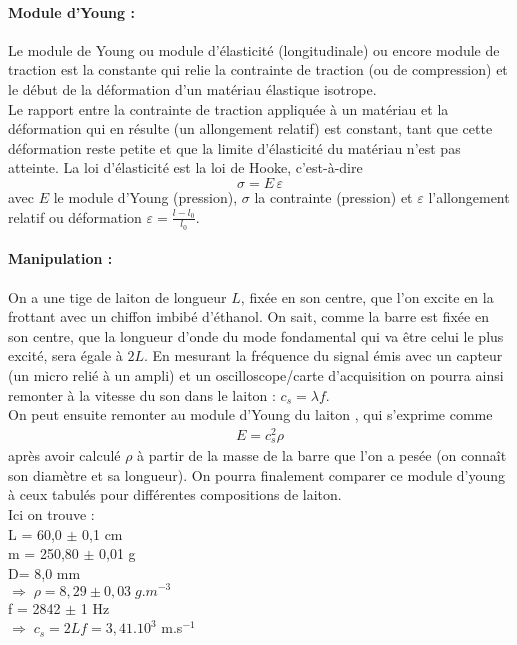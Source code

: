 \documentclass[12pt,prb,aps,epsf]{article}
\begin{document}
\paragraph{Module d'Young :}
Le module de Young ou module d’élasticité (longitudinale) ou encore module de traction est la constante qui relie la contrainte de traction (ou de compression) et le début de la déformation d'un matériau élastique isotrope.\\
Le rapport entre la contrainte de traction appliquée à un matériau et la déformation qui en résulte (un allongement relatif) est constant, tant que cette déformation reste petite et que la limite d'élasticité du matériau n'est pas atteinte. La loi d'élasticité est la loi de Hooke, c'est-à-dire
\begin{equation}
\sigma = E\, \varepsilon
\end{equation}
avec $E$ le module d'Young (pression), $\sigma$ la contrainte (pression) et $\varepsilon$ l'allongement relatif ou déformation $\varepsilon = \frac{l-l_0}{l_0}$.\\

\paragraph{Manipulation :}

On a une tige de laiton de longueur $L$, fixée en son centre, que l'on excite en la frottant avec un chiffon imbibé d'éthanol. On sait, comme la barre est fixée en son centre, que la longueur d'onde du mode fondamental qui va être celui le plus excité, sera égale à $2L$. En mesurant la fréquence du signal émis avec un capteur (un micro relié à un ampli) et un oscilloscope/carte d'acquisition on pourra ainsi remonter à la vitesse du son dans le laiton : $c_s=\lambda f$.\\ On peut ensuite remonter au module d'Young du laiton , qui s'exprime comme 
\begin{eqnarray}
E = c_s^2\rho
\end{eqnarray}
après avoir calculé $\rho$ à partir de la masse de la barre que l'on a pesée (on connaît son diamètre et sa longueur). On pourra finalement comparer ce module d'young à ceux tabulés pour différentes compositions de laiton.\\ 

Ici on trouve : \\
L = 60,0 $\pm$ 0,1 cm\\
m = 250,80 $\pm$ 0,01 g\\
D= 8,0 mm\\
$\Rightarrow \; \rho = 8,29\pm 0,03 \;g.m^{-3}$\\
f = 2842 $\pm$ 1 Hz\\
$\Rightarrow \; c_s = 2Lf = 3,41.10^3$ m.s$^{-1}$\\
\end{document}
